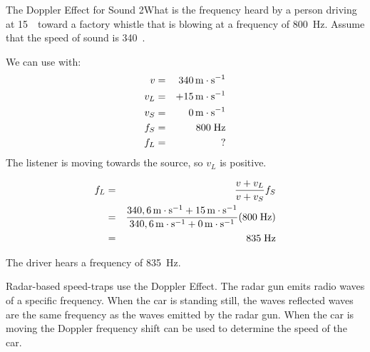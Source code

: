 \begin{wex}{The Doppler Effect for Sound 2}{What is the frequency heard by a person driving at 15~\ms\ toward a factory whistle that is blowing at a frequency of 800~Hz. Assume that the speed of sound is 340~\ms.}{
We can use
with:
\begin{eqnarray*}
v&=&340 \,\mathrm{m \cdot s^{-1}}\\
v_L&=&+15\,\mathrm{m \cdot s^{-1}}\\
v_S&=&0\,\mathrm{m \cdot s^{-1}}\\
f_S&=&800\;\rm{Hz}\\
f_L&=&\rm{?}
\end{eqnarray*}
The listener is moving towards the source, so $v_L$ is positive.

\begin{eqnarray*}
f_L&=&\frac{v + v_L}{v + v_S}f_S\\
&=&\frac{340,6\,\mathrm{m \cdot s^{-1}} + 15\,\mathrm{m \cdot s^{-1}}}{340,6\,\mathrm{m \cdot s^{-1}} + 0\,\mathrm{m \cdot s^{-1}}}(800\;\rm{Hz})\\
&=&835\;\rm{Hz}
\end{eqnarray*}

The driver hears a frequency of 835~Hz.}
\end{wex}

\begin{IFact}
{
Radar-based speed-traps use the Doppler Effect. The radar gun emits radio waves of a specific frequency. When the car is standing still, the waves reflected waves are the same frequency as the waves emitted by the radar gun. When the car is moving the Doppler frequency shift can be used to determine the speed of the car.}
\end{IFact}

